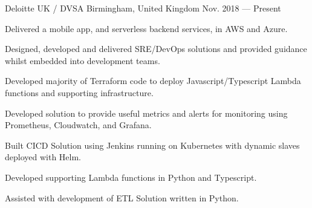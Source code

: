 

\begin{cventries}


    {Deloitte UK / DVSA}
    {Birmingham, United Kingdom}
    {Nov. 2018 — Present}
    {
        \begin{cvitems}
            \item{Delivered a mobile app, and serverless backend services, in AWS and Azure.}
            \item{Designed, developed and delivered SRE/DevOps solutions and provided guidance whilst embedded into development teams.}
            \item{Developed majority of Terraform code to deploy Javascript/Typescript Lambda functions and supporting infrastructure.}
            \item{Developed solution to provide useful metrics and alerts for monitoring using Prometheus, Cloudwatch, and Grafana.}
            \item{Built CICD Solution using Jenkins running on Kubernetes with dynamic slaves deployed with Helm.}
            \item{Developed supporting Lambda functions in Python and Typescript.}
            \item{Assisted with development of ETL Solution written in Python.}
        \end{cvitems}
    }


\end{cventries}
